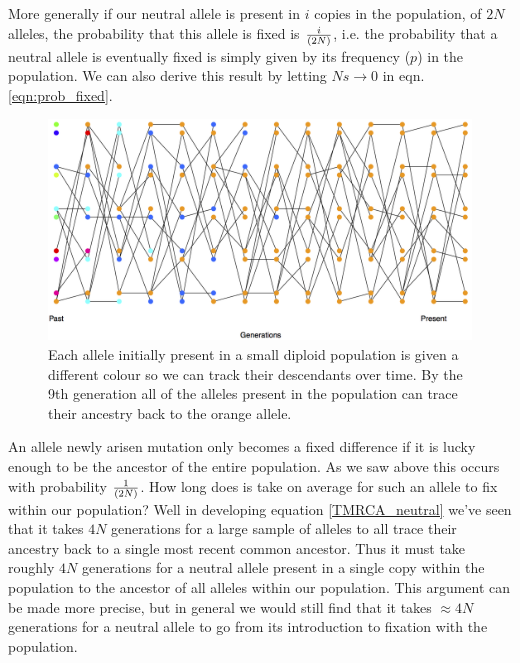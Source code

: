 More generally if our neutral allele is present in $i$ copies in the
population, of $2N$ alleles, the probability that this allele is fixed is
$\nicefrac{i}{(2N)}$, i.e. the probability that a neutral allele is eventually
fixed is simply given by its frequency ($p$) in the population.  We can also
derive this result by letting $Ns \rightarrow 0$ in eqn.
\eqref{eqn:prob_fixed}.

\begin{figure}
\begin{center}
  \includegraphics[width = \textwidth]{figures/Substitution_sim.png}
\end{center}
\caption{Each allele initially present in a small diploid population is
  given a different colour so we can track their descendants over
  time. By the 9th generation all of the alleles present in the
  population can trace their ancestry back to the orange allele.} \label{fig:subs_simulation}
\end{figure}


An allele newly arisen mutation only becomes a fixed difference if it is lucky
enough to be the ancestor of the entire population. As we saw above this occurs
with probability $\nicefrac{1}{(2N)}$. How long does is take on average for
such an allele to fix within our population? Well in developing
equation \eqref{TMRCA_neutral} we've seen that it takes $4N$
generations for a large sample of alleles to all trace their ancestry back to a
single most recent common ancestor. Thus it must take roughly $4N$ generations
for a neutral allele present in a single copy within the population to the
ancestor of all alleles within our population. This argument can be made more
precise, but in general we would still find that it takes $\approx 4N$
generations for a neutral allele to go from its introduction to fixation with
the population.   \\


